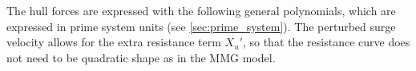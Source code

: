 The hull forces are expressed with the following general polynomials, which are expressed in prime system units (see \autoref{sec:prime_system}). The perturbed surge velocity allows for the extra resistance term ${X_u}'$, so that the resistance curve does not need to be quadratic shape as in the MMG model.  
\begin{equation}
    \label{eq:X_H}
    
\end{equation}
%
\begin{equation}
    \label{eq:Y_H}
    
\end{equation}
%
\begin{equation}
    \label{eq:N_H}
    
\end{equation}
